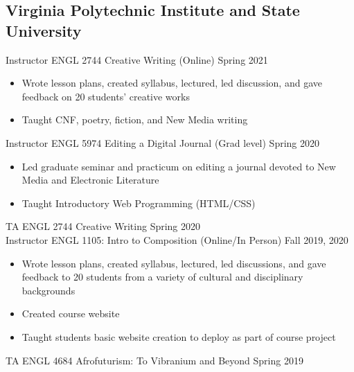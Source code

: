 \subsection{Virginia Polytechnic Institute and State University}
  
Instructor ENGL 2744 Creative Writing (Online) \hfill Spring 2021\\
\begin{itemize} 
\item Wrote lesson plans, created syllabus, lectured, led discussion, and gave feedback on 20 students' creative works 
\item Taught CNF, poetry, fiction, and New Media writing
\end{itemize} 
Instructor ENGL 5974 Editing a Digital Journal (Grad level) \hfill Spring 2020 \\
\begin{itemize}
\item Led graduate seminar and practicum on editing a journal devoted to New Media and Electronic Literature
\item Taught Introductory Web Programming (HTML/CSS)
\end{itemize}
TA ENGL 2744 Creative Writing \hfill Spring 2020\\

Instructor ENGL 1105: Intro to Composition (Online/In Person) \hfill Fall 2019, 2020\\
\begin{itemize}
\item Wrote lesson plans, created syllabus, lectured, led discussions, and gave feedback to 20 students from a variety of cultural and disciplinary backgrounds
\item Created course website
\item Taught students basic website creation to deploy as part of course project
\end{itemize}
TA ENGL 4684 Afrofuturism: To Vibranium and Beyond \hfill Spring 2019 \\
